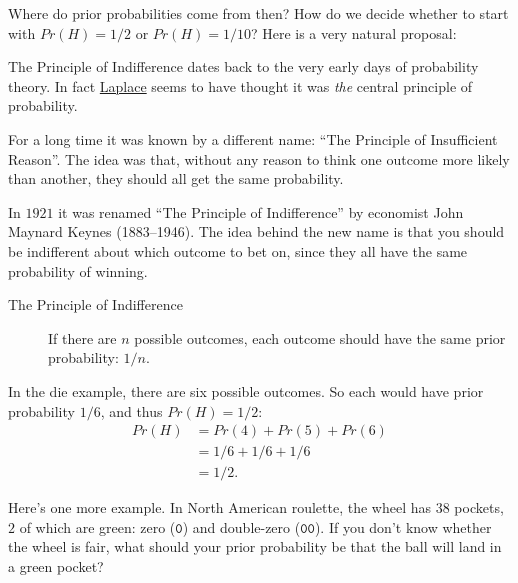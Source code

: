 \documentclass[justified]{tufte-book}
\newcommand{\pr}{Pr}
\theoremstyle{definition}
\theoremstyle{definition}
\theoremstyle{definition}
\theoremstyle{remark}
\begin{document}
Where do prior probabilities come from then? How do we decide whether to start with \(\pr(H) = 1/2\) or \(\pr(H) = 1/10\)? Here is a very natural proposal:

\begin{marginfigure}
The Principle of Indifference dates back to the very early days of
probability theory. In fact \protect\hyperlink{fig:laplace}{Laplace}
seems to have thought it was \emph{the} central principle of
probability.

For a long time it was known by a different name: ``The Principle of
Insufficient Reason''. The idea was that, without any reason to think
one outcome more likely than another, they should all get the same
probability.

In \(1921\) it was renamed ``The Principle of Indifference'' by
economist John Maynard Keynes (1883--1946). The idea behind the new name
is that you should be indifferent about which outcome to bet on, since
they all have the same probability of winning.
\end{marginfigure}

\begin{description}
\item[The Principle of Indifference]
If there are \(n\) possible outcomes, each outcome should have the same prior probability: \(1/n\).
\end{description}

In the die example, there are six possible outcomes. So each would have prior probability \(1/6\), and thus \(\pr(H) = 1/2\):
\[
  \begin{aligned}
    \pr(H) &= \pr(4) + \pr(5) + \pr(6)\\
          &= 1/6 + 1/6 + 1/6\\
          &= 1/2.
  \end{aligned}
\]

Here's one more example. In North American roulette, the wheel has \(38\) pockets, \(2\) of which are green: zero (\(\mathtt{0}\)) and double-zero (\(\mathtt{00}\)). If you don't know whether the wheel is fair, what should your prior probability be that the ball will land in a green pocket?
\end{document}
